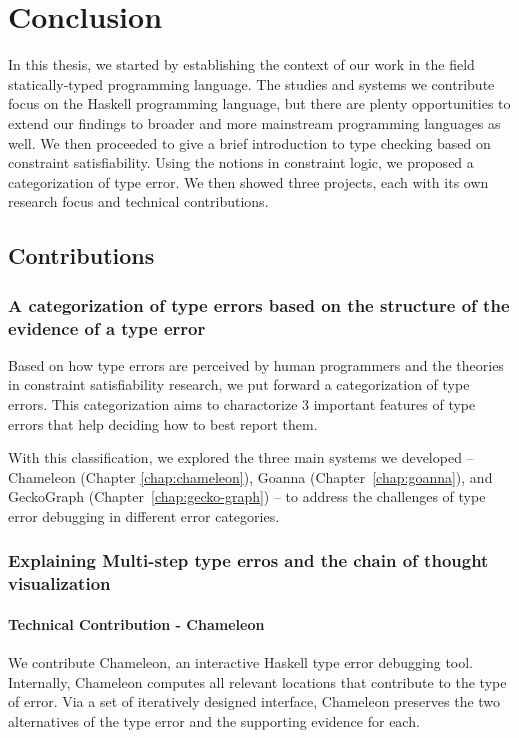 

\chapter{Conclusion}

\label{chap:conclusion} 
\newcommand{\toolname}{TypeTutor}



\graphicspath{{Figures/Conclusion}}

In this thesis, we started by establishing the context of our work in the field statically-typed programming language. The studies and systems we contribute focus on the Haskell programming language, but there are plenty opportunities to extend our findings to broader and more mainstream programming languages as well. We then proceeded to give a brief introduction to type checking based on constraint satisfiability. Using the notions in constraint logic, we proposed a categorization of type error. We then showed three projects, each with its own research focus and technical contributions.


\section{Contributions}


\subsection{A categorization of type errors based on the structure of the evidence of a type error}

Based on how type errors are perceived by human programmers and the theories in constraint satisfiability research, we put forward a categorization of type errors. This categorization aims to charactorize 3 important features of type errors that help deciding how to best report them. 


With this classification, we explored the three main systems we developed --  Chameleon (Chapter \ref{chap:chameleon}), Goanna (Chapter~\ref{chap:goanna}), and GeckoGraph (Chapter~\ref{chap:gecko-graph}) -- to address the challenges of type error debugging in different error categories.

\subsection{Explaining Multi-step type erros and the chain of thought visualization}

\subsubsection{Technical Contribution - Chameleon}
We contribute Chameleon, an interactive Haskell type error debugging tool. Internally, Chameleon computes all relevant locations that contribute to the type of error. Via a set of iteratively designed interface, Chameleon preserves the two alternatives of the type error and the supporting evidence for each.

